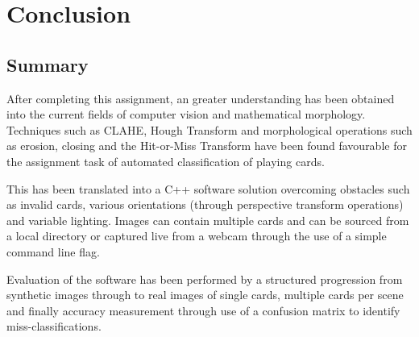 \documentclass[a4paper,12pt,notitlepage]{article}
\begin{document}
\section{Conclusion}
	\subsection{Summary}
		After completing this assignment, an greater understanding has been obtained into the current fields of computer vision and mathematical morphology. Techniques such as CLAHE, Hough Transform and morphological operations such as erosion, closing and the Hit-or-Miss Transform have been found favourable for the assignment task of automated classification of playing cards.

		This has been translated into a C++ software solution overcoming obstacles such as invalid cards, various orientations (through perspective transform operations) and variable lighting. Images can contain multiple cards and can be sourced from a local directory or captured live from a webcam through the use of a simple command line flag.

		Evaluation of the software has been performed by a structured progression from synthetic images through to real images of single cards, multiple cards per scene and finally accuracy measurement through use of a confusion matrix to identify miss-classifications.
\end{document}
